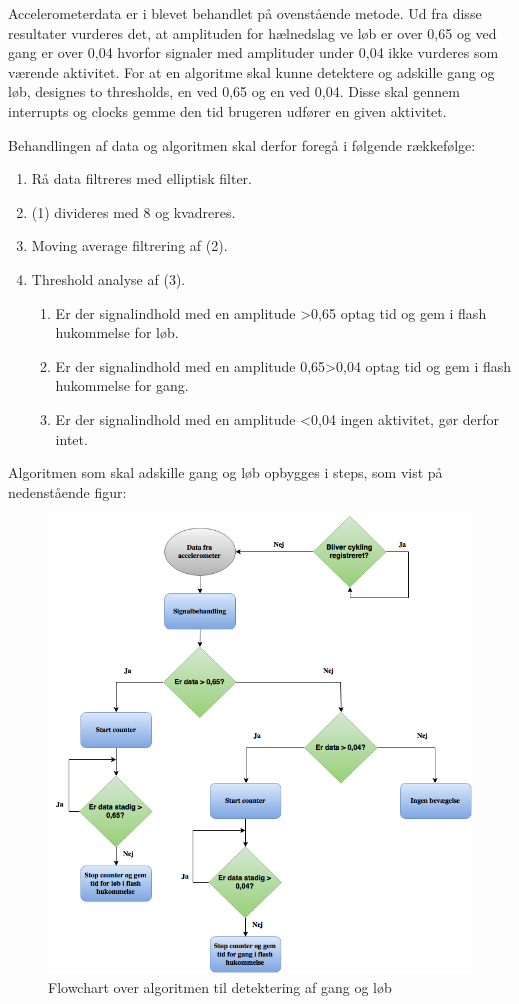 Accelerometerdata er i  blevet behandlet på ovenstående metode. Ud fra disse resultater vurderes det, at amplituden for hælnedslag ve løb er over 0,65 og ved gang er over 0,04 hvorfor signaler med amplituder under 0,04 ikke vurderes som værende aktivitet. For at en algoritme skal kunne detektere og adskille gang og løb, designes to thresholds, en ved 0,65 og en ved 0,04. Disse skal gennem interrupts og clocks gemme den tid brugeren udfører en given aktivitet.

Behandlingen af data og algoritmen skal derfor foregå i følgende rækkefølge:
\begin{enumerate}
	\item Rå data filtreres med elliptisk filter.
	\item (1) divideres med 8 og kvadreres.
	\item Moving average filtrering af (2). 
	\item Threshold analyse af (3). 
	\begin{enumerate}
		\item Er der signalindhold med en amplitude >0,65 \textrightarrow optag tid og gem i flash hukommelse for løb.
		\item Er der signalindhold med en amplitude 0,65>0,04 \textrightarrow optag tid og gem i flash hukommelse for gang.
		\item Er der signalindhold med en amplitude <0,04 \textrightarrow ingen aktivitet, gør derfor intet.
	\end{enumerate}
\end{enumerate}

Algoritmen som skal adskille gang og løb opbygges i steps, som vist på nedenstående figur:
\begin{figure}[H]
	\centering
	\includegraphics[scale=0.5]{figures/cDesign/algoritme_gl.png}
	\caption{Flowchart over algoritmen til detektering af gang og løb}
	\label{fig:algoritme}
\end{figure}

